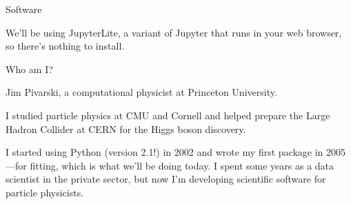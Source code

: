 \documentclass[aspectratio=169]{beamer}
\begin{document}
\begin{frame}{Software}
\Large
\vspace{0.5 cm}

We'll be using JupyterLite, a variant of Jupyter that runs in your web browser, so there's nothing to install.

\vspace{1 cm}
\end{frame}

\begin{frame}{Who am I?}
\Large
\vspace{0.5 cm}

Jim Pivarski, a computational physicist at Princeton University.

\normalsize
\vspace{1 cm}
I studied particle physics at CMU and Cornell and helped prepare the Large Hadron Collider at CERN for the Higgs boson discovery.

\vspace{0.5 cm}
I started using Python (version 2.1!) in 2002 and wrote my first package in 2005---for fitting, which is what we'll be doing today. I spent some years as a data scientist in the private sector, but now I'm developing scientific software for particle physicists.
\end{frame}
\end{document}
